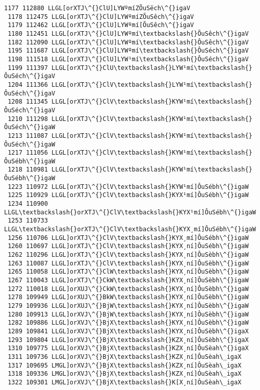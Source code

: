 \documentclass[11pt]{article}
\begin{document}
\begin{Verbatim}[commandchars=\\\{\}]
 1177 112880 LLGL[orXTJ\^{}ClU]LYWºmíZÕuSëch\^{}igaV
 1178 112475 LLGL[orXTJ\^{}ClU]LYWºmíZÕuSêch\^{}igaV
 1179 112462 LLGL[orXTJ\^{}ClU]LYWºmí[ÕuSêch\^{}igaV
 1180 112451 LLGL[orXTJ\^{}ClU]LYWºmí\textbackslash{}ÕuSêch\^{}igaV
 1182 112090 LLGL[orXTJ\^{}ClU]LYWºmí\textbackslash{}ÔuSêch\^{}igaV
 1195 111687 LLGL[orXTJ\^{}ClU]LYWºmí\textbackslash{}ÔuSéch\^{}igaV
 1198 111518 LLGL[orXTJ\^{}ClU]LYW¹mí\textbackslash{}ÔuSéch\^{}igaV
 1199 111397 LLGL[orXTJ\^{}ClU\textbackslash{}LYW¹mí\textbackslash{}ÔuSéch\^{}igaV
 1204 111366 LLGL[orXTJ\^{}ClV\textbackslash{}LYW¹mí\textbackslash{}ÔuSéch\^{}igaV
 1208 111345 LLGL[orXTJ\^{}ClV\textbackslash{}KYW¹mí\textbackslash{}ÔuSéch\^{}igaV
 1210 111298 LLGL[orXTJ\^{}ClV\textbackslash{}KYW¹mí\textbackslash{}ÔuSéch\^{}igaW
 1213 111087 LLGL[orXTJ\^{}ClV\textbackslash{}KYW¹mí\textbackslash{}ÔuSéch\^{}igaW
 1217 111056 LLGL[orXTJ\^{}ClV\textbackslash{}KYW¹mí\textbackslash{}ÔuSébh\^{}igaW
 1218 110981 LLGL[orXTJ\^{}ClV\textbackslash{}KYW¹mí\textbackslash{}ÔuSébh\^{}igaW
 1223 110972 LLGL[orXTJ\^{}ClV\textbackslash{}KYW¹mí]ÔuSébh\^{}igaW
 1225 110929 LLGL[orXTJ\^{}ClV\textbackslash{}KYX¹mí]ÔuSébh\^{}igaW
 1234 110900 LLGL\textbackslash{}orXTJ\^{}ClV\textbackslash{}KYX¹mí]ÔuSébh\^{}igaW
 1253 110733 LLGL\textbackslash{}orXTJ\^{}ClV\textbackslash{}KYX¸mí]ÔuSébh\^{}igaW
 1256 110706 LLGL]orXTJ\^{}ClV\textbackslash{}KYX¸mí]ÔuSébh\^{}igaW
 1260 110697 LLGL]orXTJ\^{}ClV\textbackslash{}KYX¸ní]ÔuSébh\^{}igaW
 1262 110296 LLGL]orXTJ\^{}ClV\textbackslash{}KYX¸ní]ÔuSèbh\^{}igaW
 1263 110087 LLGL]orXTJ\^{}ClV\textbackslash{}KYX¸ní]ÔuSèbh\^{}igaW
 1265 110058 LLGL]orXTJ\^{}ClW\textbackslash{}KYX¸ní]ÔuSèbh\^{}igaW
 1267 110043 LLGL]orXTJ\^{}CkW\textbackslash{}KYX¸ní]ÔuSèbh\^{}igaW
 1272 110018 LLGL]orXUJ\^{}CkW\textbackslash{}KYX¸ní]ÔuSèbh\^{}igaW
 1278 109949 LLGL]orXUJ\^{}BkW\textbackslash{}KYX¸ní]ÔuSèbh\^{}igaW
 1279 109936 LLGL]orXUJ\^{}BjW\textbackslash{}KYX¸ní]ÔuSèbh\^{}igaW
 1280 109913 LLGL]orXVJ\^{}BjW\textbackslash{}KYX¸ní]ÔuSèbh\^{}igaW
 1282 109886 LLGL]orXVJ\^{}BjX\textbackslash{}KYX¸ní]ÔuSèbh\^{}igaW
 1289 109841 LLGL]orXVJ\^{}BjX\textbackslash{}KYX¸ní]ÔuSèbh\^{}igaX
 1293 109804 LLGL]orXVJ\^{}BjX\textbackslash{}KZX¸ní]ÔuSèbh\^{}igaX
 1310 109775 LLGL]orXVJ\^{}BjX\textbackslash{}KZX¸ní]ÔuSèah\^{}igaX
 1311 109736 LLGL]orXVJ\^{}BjX\textbackslash{}KZX¸ní]ÔuSèah\_igaX
 1317 109695 LMGL]orXVJ\^{}BjX\textbackslash{}KZX¸ní]ÔuSèah\_igaX
 1318 109336 LMGL]orXVJ\^{}BjX\textbackslash{}KZX¸ní]ÓuSèah\_igaX
 1322 109301 LMGL]orXVJ\^{}BjX\textbackslash{}K[X¸ní]ÓuSèah\_igaX

\end{Verbatim}
\end{document}
